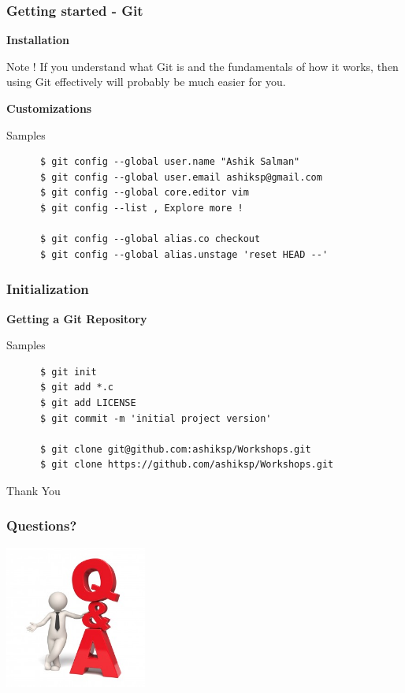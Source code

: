\documentclass[10pt]{beamer}
\begin{document}
\begin{frame}[fragile]
  \frametitle{Getting started - Git}
  \textbf{Installation}
  \begin{exampleblock}{Note !}
    If you understand what Git is and the fundamentals of how it works, then using Git effectively
    will probably be much easier for you.
  \end{exampleblock}
  \textbf{Customizations} \\
  \pause
  \begin{block}{Samples}
    \begin{verbatim}
      $ git config --global user.name "Ashik Salman"
      $ git config --global user.email ashiksp@gmail.com
      $ git config --global core.editor vim
      $ git config --list , Explore more !

      $ git config --global alias.co checkout
      $ git config --global alias.unstage 'reset HEAD --'
    \end{verbatim}
  \end{block}
\end{frame}

\begin{frame}[fragile]
  \frametitle{Initialization}
  \textbf{Getting a Git Repository}
  \begin{block}{Samples}
    \begin{verbatim}
      $ git init
      $ git add *.c
      $ git add LICENSE
      $ git commit -m 'initial project version'

      $ git clone git@github.com:ashiksp/Workshops.git
      $ git clone https://github.com/ashiksp/Workshops.git
    \end{verbatim}
  \end{block}
\end{frame}

\begin{frame}
  \begin{center}
    \Huge{Thank You}
  \end{center}
\end{frame}

\begin{frame}
	\frametitle{Questions?}
	\begin{center}
	\includegraphics[width=0.35\textwidth]{q2.jpg}
	\end{center}
\end{frame}

\end{document}
